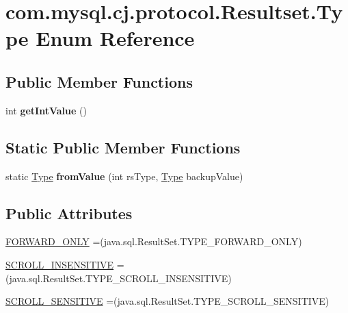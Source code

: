 \hypertarget{enumcom_1_1mysql_1_1cj_1_1protocol_1_1_resultset_1_1_type}{}\section{com.\+mysql.\+cj.\+protocol.\+Resultset.\+Type Enum Reference}
\label{enumcom_1_1mysql_1_1cj_1_1protocol_1_1_resultset_1_1_type}
\subsection*{Public Member Functions}
\begin{DoxyCompactItemize}
\item 
\mbox{\label{enumcom_1_1mysql_1_1cj_1_1protocol_1_1_resultset_1_1_type_a2500831bed3fcee1b1cc83dab7e6e7f8}} 
int {\bfseries get\+Int\+Value} ()
\end{DoxyCompactItemize}
\subsection*{Static Public Member Functions}
\begin{DoxyCompactItemize}
\item 
\mbox{\label{enumcom_1_1mysql_1_1cj_1_1protocol_1_1_resultset_1_1_type_a174cc1631551f349e2fd24317afe1093}} 
static \mbox{\hyperlink{enumcom_1_1mysql_1_1cj_1_1protocol_1_1_resultset_1_1_type}{Type}} {\bfseries from\+Value} (int rs\+Type, \mbox{\hyperlink{enumcom_1_1mysql_1_1cj_1_1protocol_1_1_resultset_1_1_type}{Type}} backup\+Value)
\end{DoxyCompactItemize}
\subsection*{Public Attributes}
\begin{DoxyCompactItemize}
\item 
\mbox{\hyperlink{enumcom_1_1mysql_1_1cj_1_1protocol_1_1_resultset_1_1_type_ad7cddf3eb759b3961780262b09b0217b}{F\+O\+R\+W\+A\+R\+D\+\_\+\+O\+N\+LY}} =(java.\+sql.\+Result\+Set.\+T\+Y\+P\+E\+\_\+\+F\+O\+R\+W\+A\+R\+D\+\_\+\+O\+N\+LY)
\item 
\mbox{\hyperlink{enumcom_1_1mysql_1_1cj_1_1protocol_1_1_resultset_1_1_type_ae4e2e9239fda047eb59e0916b48dee4b}{S\+C\+R\+O\+L\+L\+\_\+\+I\+N\+S\+E\+N\+S\+I\+T\+I\+VE}} =(java.\+sql.\+Result\+Set.\+T\+Y\+P\+E\+\_\+\+S\+C\+R\+O\+L\+L\+\_\+\+I\+N\+S\+E\+N\+S\+I\+T\+I\+VE)
\item 
\mbox{\hyperlink{enumcom_1_1mysql_1_1cj_1_1protocol_1_1_resultset_1_1_type_a61adf90ea3124efe223bb2b80b921233}{S\+C\+R\+O\+L\+L\+\_\+\+S\+E\+N\+S\+I\+T\+I\+VE}} =(java.\+sql.\+Result\+Set.\+T\+Y\+P\+E\+\_\+\+S\+C\+R\+O\+L\+L\+\_\+\+S\+E\+N\+S\+I\+T\+I\+VE)
\end{DoxyCompactItemize}


